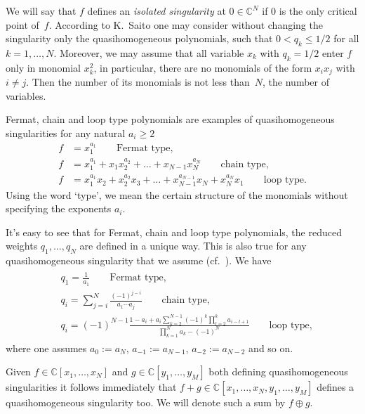 \documentclass[pdftex]{sigma}
\numberwithin{equation}{section}
\newcommand{\CC}{{\mathbb{C}}}
\begin{document}
We will say that $f$ defines an \textit{isolated singularity} at $0 \in \CC^N$ if $0$ is the only critical point of~$f$.
According to K.~Saito \cite[Satz~1.3]{S71} one may consider without changing the singularity only the quasihomogeneous polynomials, such that $0 < q_k \le 1/2$ for all $k=1,\dots,N$. Moreover, we may assume that all variable $x_k$ with $q_k=1/2$ enter $f$ only in monomial $x_k^2$, in particular, there are no monomials of the form $x_ix_j$ with $i\ne j$. Then the number of its monomials is not less than~$N$, the number of variables.

\begin{Example}
 Fermat, chain and loop type polynomials are examples of quasihomogeneous singularities for any natural $a_i \ge 2$
 \begin{align*}
	 f &= x_1^{a_1} \qquad \text{Fermat type},
	 \\
	 f &= x_1^{a_1} + x_1 x_2^{a_2} + \dots + x_{N-1} x_N^{a_N} \qquad \text{chain type},
	 \\
	 f &= x_1^{a_1}x_2 + x_2^{a_2}x_3 + \dots + x_{N-1}^{a_{N-1}}x_N + x_N^{a_N}x_1 \qquad \text{loop type}.
 \end{align*}
 Using the word `type', we mean the certain structure of the monomials without specifying the exponents $a_i$.
\end{Example}

It's easy to see that for Fermat, chain and loop type polynomials, the reduced weights $q_1,\dots,q_N$ are defined in a unique way. This is also true for any quasihomogeneous singularity that we assume (cf.\ \cite[Korollar~1.7]{S71}). We have
\begin{align*}
\begin{split}
 & q_1 = \frac{1}{a_1} \qquad \text{Fermat type,}
 \\
 & q_i = \sum_{j=i}^N\frac{(-1)^{j-i}}{a_1\cdots a_j} \qquad \text{chain type,}
 \\
 & q_i = (-1)^{N-1}\frac{1 - a_i + a_i \sum_{k=2}^{N-1} (-1)^k \prod_{l=2}^k a_{i-l+1}}{\prod_{k=1}^N a_k - (-1)^N} \qquad \text{loop type,}
 \end{split}
\end{align*}
where one assumes $a_0 := a_N$, $a_{-1} := a_{N-1}$, $a_{-2} := a_{N-2}$ and so on.


Given $f \in \CC[x_1,\dots,x_N]$ and $g \in \CC[y_1,\dots,y_M]$ both defining quasihomogeneous singularities it follows immediately that $f+g \in \CC[x_1,\dots,x_N,y_1,\dots,y_M]$ defines a quasihomogeneous singularity too. We will denote such a sum by $f \oplus g$.
\end{document}
